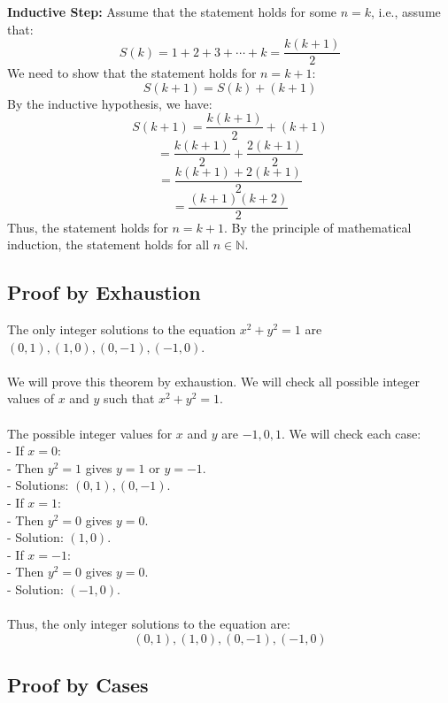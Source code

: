 	\textbf{Inductive Step:} Assume that the statement holds for some \( n = k \), i.e., assume that:
	\[
		S(k) = 1 + 2 + 3 + \cdots + k = \frac{k(k+1)}{2}
	\]
	We need to show that the statement holds for \( n = k + 1 \):
	\[
		S(k+1) = S(k) + (k + 1)
	\]
	By the inductive hypothesis, we have:
	\[
		S(k+1) = \frac{k(k+1)}{2} + (k + 1)
	\]
	\[
		= \frac{k(k+1)}{2} + \frac{2(k + 1)}{2}
	\]
	\[      = \frac{k(k+1) + 2(k + 1)}{2}
	\]
	\[
		= \frac{(k + 1)(k + 2)}{2}
	\]
	Thus, the statement holds for \( n = k + 1 \).
	By the principle of mathematical induction, the statement holds for all \( n \in \mathbb{N} \).

\QED

\subsection{Proof by Exhaustion}

The only integer solutions to the equation \( x^2 + y^2 = 1 \) are \( (0, 1), (1, 0), (0, -1), (-1, 0) \).
\\\\
	We will prove this theorem by exhaustion. We will check all possible integer values of \( x \) and \( y \) such that \( x^2 + y^2 = 1 \).
\\\\
	The possible integer values for \( x \) and \( y \) are \( -1, 0, 1 \). We will check each case:
	\\
	- If \( x = 0 \):
	\\
	- Then \( y^2 = 1 \) gives \( y = 1 \) or \( y = -1 \).
	\\
	- Solutions: \( (0, 1), (0, -1) \).
	\\
	- If \( x = 1 \):
	\\
	- Then \( y^2 = 0 \) gives \( y = 0 \).
	\\
	- Solution: \( (1, 0) \).
	\\
	- If \( x = -1 \):
	\\
	- Then \( y^2 = 0 \) gives \( y = 0 \).
	\\
	- Solution: \( (-1, 0) \).
\\\\
	Thus, the only integer solutions to the equation are:
	\[
		(0, 1), (1, 0), (0, -1), (-1, 0)
	\]

\QED

\subsection{Proof by Cases}

